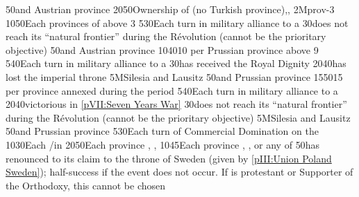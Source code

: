 {}{50}{\provinceSilesie and \provinceLausitz Austrian province}%
%
%
%
{20}{50}{Ownership of \payshongrie (no Turkish
  province),\provinceBosna,\provinceSerbia}%
%
\EUobjective2M{\paysnaples}{prov-3}%
{10}{50}{Each provinces of \paysnaples above 3}%
%
%
{5}{30}{Each turn in military alliance to a \MAJ}%
%
%
{}{30}{\paysmajeurFrance does not reach its ``natural frontier'' during the
  Révolution (cannot be the prioritary objective)}%
%
%
{}{50}{\provinceSilesie and \provinceLausitz Austrian province}%
%
 
%
%
{10}{40}{10 \VPs per Prussian province above 9}%
%
%
{5}{40}{Each turn in military alliance to a \MAJ}%
%
%
{}{30}{\paysmajeurPrusse has received the Royal Dignity}%
%
%
{20}{40}{\AUS has lost the imperial throne}%
%
\EUobjective5M{Silesia and Lausitz}{}%
{}{50}{\provinceSilesie and \provinceLausitz Prussian province}%
%
%
%
{15}{50}{15 \VPs per province annexed during the period}%
%
%
{5}{40}{Each turn in military alliance to a \MAJ}%
%
%
{20}{40}{\PRU victorious in \ref{pVII:Seven Years War}}%
%
%
{}{30}{\paysmajeurFrance does not reach its ``natural frontier'' during the
  Révolution (cannot be the prioritary objective)}%
%
\EUobjective5M{Silesia and Lausitz}{}%
{}{50}{\provinceSilesie and \provinceLausitz Prussian province}%
%
 
%
%
{5}{30}{Each turn of Commercial Domination on the }%
%
%
%
{10}{30}{Each \COL/\TP in }%
%
%
{20}{50}{Each province \provinceNeva, \provinceLivonija, \provinceEstland}%
%
%
{10}{45}{Each province \provinceSkane, \provinceVastergotland,
  \provinceGotland or any of \regionNorvege}%
%
%
{}{50}{\POL has renounced to its claim to the throne of Sweden (given by
  \ref{pIII:Union Poland Sweden}); half-success if the event does not
  occur. If \POL is protestant or Supporter of the Orthodoxy, this cannot be
  chosen}%
